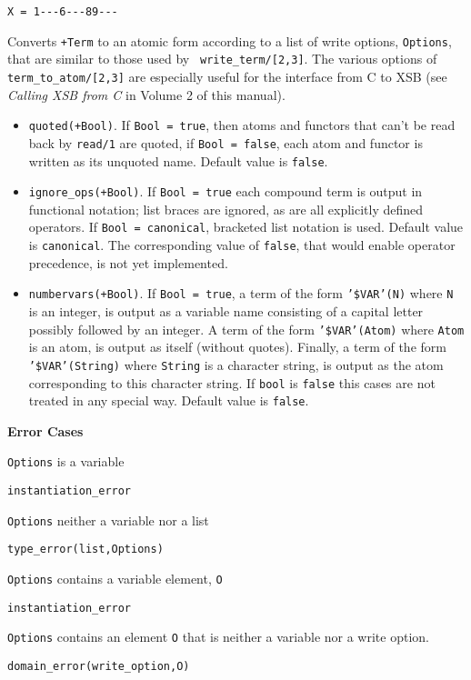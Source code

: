 \begin{description}
\begin{verbatim}
X = 1---6---89---
\end{verbatim}

%
Converts {\tt +Term} to an atomic form according to a list of write
options, {\tt Options}, that are similar to those used by {\tt
write\_term/[2,3]}.  The various options of {\tt
term\_to\_atom/[2,3]} are especially useful for the interface from C
to XSB (see {\em Calling XSB from C} in Volume 2 of this manual).
%
\begin{itemize}
%
\item {\tt quoted(+Bool)}.  If {\tt Bool = true}, then atoms and
    functors that can't be read back by {\tt read/1} are quoted, if
    {\tt Bool = false}, each atom and functor is written as its
    unquoted name. Default value is {\tt false}.
%
\item {\tt ignore\_ops(+Bool)}. If {\tt Bool = true} each compound term
is output in functional notation; list braces are ignored, as are all
explicitly defined operators.  If {\tt Bool = canonical}, bracketed list
notation is used.  Default value is {\tt canonical}.  The
corresponding value of {\tt false}, that would enable operator
precedence, is not yet implemented.
%
 \item {\tt numbervars(+Bool)}.  If {\tt Bool = true}, a term of the
form {\tt '\$VAR'(N)} where {\tt N} is an integer, is output as a
variable name consisting of a capital letter possibly followed by an
integer.  A term of the form {\tt '\$VAR'(Atom)} where {\tt Atom} is an
atom, is output as itself (without quotes).  Finally, a term of the
form {\tt '\$VAR'(String)} where {\tt String} is a character string, is
output as the atom corresponding to this character string.  If
{\tt bool} is {\tt false} this cases are not treated in any special
way.  Default value is {\tt false}.
%
\end{itemize}

{\bf Error Cases} 
\bi
\item 	{\tt Options} is a variable
\bi
\item    {\tt instantiation\_error}
\ei
\item 	{\tt Options} neither a variable nor a list
\bi
\item    {\tt type\_error(list,Options)}
\ei
\item 	{\tt Options} contains a variable element, {\tt O}
\bi
\item    {\tt instantiation\_error}
\ei
\item 	{\tt Options} contains an element {\tt O} that is neither a variable
nor a write option.
\bi
\item    {\tt domain\_error(write\_option,O)}
\ei
\ei


\end{description}
